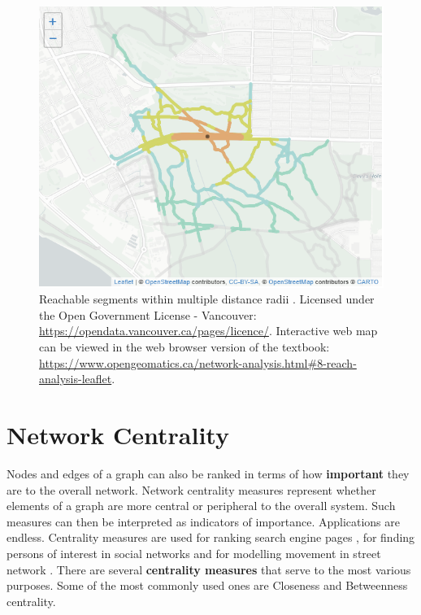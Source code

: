 \documentclass[
]{book}
\begin{document}
\begin{figure}
\includegraphics[width=8.57in]{images/08-Reachable-segments-within-multiple-distance-radii-static} \caption{Reachable segments within multiple distance radii \citep{city_of_vancouver_open_nodate}. Licensed under the Open Government License - Vancouver: \url{https://opendata.vancouver.ca/pages/licence/}. Interactive web map can be viewed in the web browser version of the textbook: \url{https://www.opengeomatics.ca/network-analysis.html\#8-reach-analysis-leaflet}.}\label{fig:8-reach-analysis-leaflet}
\end{figure}

\section{Network Centrality}\label{network-centrality}

Nodes and edges of a graph can also be ranked in terms of how \textbf{important} they are to the overall network. Network centrality measures represent whether elements of a graph are more central or peripheral to the overall system. Such measures can then be interpreted as indicators of importance. Applications are endless. Centrality measures are used for ranking search engine pages \citep{wikimedia_pagerank_2021}, for finding persons of interest in social networks \citep{ajorlou_introduction_2018} and for modelling movement in street network \citep{hillier_natural_1993}. There are several \textbf{centrality measures} that serve to the most various purposes. Some of the most commonly used ones are Closeness and Betweenness centrality.
\end{document}
